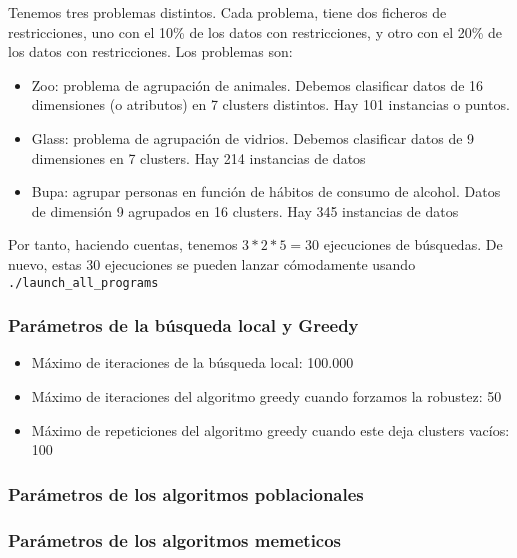 \documentclass[11pt]{article}
\begin{document}
Tenemos tres problemas distintos. Cada problema, tiene dos ficheros de restricciones, uno con el 10\% de los datos con restricciones, y otro con el 20\% de los datos con restricciones. Los problemas son:

\begin{itemize}
    \item Zoo: problema de agrupación de animales. Debemos clasificar datos de 16 dimensiones (o atributos) en 7 clusters distintos. Hay 101 instancias o puntos.
    \item Glass: problema de agrupación de vidrios. Debemos clasificar datos de 9 dimensiones en 7 clusters. Hay 214 instancias de datos
    \item Bupa: agrupar personas en función de hábitos de consumo de alcohol. Datos de dimensión 9 agrupados en 16 clusters. Hay 345 instancias de datos
\end{itemize}

Por tanto, haciendo cuentas, tenemos $3 * 2 * 5 = 30$ ejecuciones de búsquedas. De nuevo, estas 30 ejecuciones se pueden lanzar cómodamente usando \lstinline{./launch_all_programs}

\subsubsection{Parámetros de la búsqueda local y Greedy}

\begin{itemize}
    \item Máximo de iteraciones de la búsqueda local: 100.000
    \item Máximo de iteraciones del algoritmo greedy cuando forzamos la robustez: 50
    \item Máximo de repeticiones del algoritmo greedy cuando este deja clusters vacíos: 100
\end{itemize}

\subsubsection{Parámetros de los algoritmos poblacionales} \label{section:parametros_poblacionales}

\subsubsection{Parámetros de los algoritmos memeticos} \label{section:parametros_memeticos}

\end{document}
